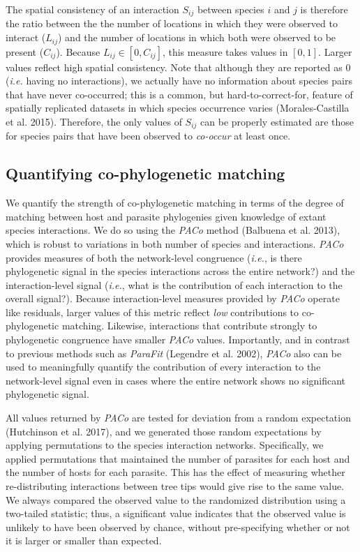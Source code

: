 \documentclass[12pt]{article}
\begin{document}
The spatial consistency of an interaction \(S_{ij}\) between species
\(i\) and \(j\) is therefore the ratio between the the number of
locations in which they were observed to interact (\(L_{ij}\)) and the
number of locations in which both were observed to be present
(\(C_{ij}\)). Because \(L_{ij} \in [0,C_{ij}]\), this measure takes
values in \([0,1]\). Larger values reflect high spatial consistency.
Note that although they are reported as 0 (\emph{i.e.} having no
interactions), we actually have no information about species pairs that
have never co-occurred; this is a common, but hard-to-correct-for,
feature of spatially replicated datasets in which species occurrence
varies (Morales-Castilla et al. 2015). Therefore, the only values of
\(S_{ij}\) can be properly estimated are those for species pairs that
have been observed to \emph{co-occur} at least once.

\subsection{Quantifying co-phylogenetic
matching}\label{quantifying-co-phylogenetic-matching}

We quantify the strength of co-phylogenetic matching in terms of the
degree of matching between host and parasite phylogenies given knowledge
of extant species interactions. We do so using the \emph{PACo} method
(Balbuena et al. 2013), which is robust to variations in both number of
species and interactions. \emph{PACo} provides measures of both the
network-level congruence (\emph{i.e.}, is there phylogenetic signal in
the species interactions across the entire network?) and the
interaction-level signal (\emph{i.e.}, what is the contribution of each
interaction to the overall signal?). Because interaction-level measures
provided by \emph{PACo} operate like residuals, larger values of this
metric reflect \emph{low} contributions to co-phylogenetic matching.
Likewise, interactions that contribute strongly to phylogenetic
congruence have smaller \emph{PACo} values. Importantly, and in contrast
to previous methods such as \emph{ParaFit} (Legendre et al. 2002),
\emph{PACo} also can be used to meaningfully quantify the contribution
of every interaction to the network-level signal even in cases where the
entire network shows no significant phylogenetic signal.

All values returned by \emph{PACo} are tested for deviation from a
random expectation (Hutchinson et al. 2017), and we generated those
random expectations by applying permutations to the species interaction
networks. Specifically, we applied permutations that maintained the
number of parasites for each host and the number of hosts for each
parasite. This has the effect of measuring whether re-distributing
interactions between tree tips would give rise to the same value. We
always compared the observed value to the randomized distribution using
a two-tailed statistic; thus, a significant value indicates that the
observed value is unlikely to have been observed by chance, without
pre-specifying whether or not it is larger or smaller than expected.
\end{document}

